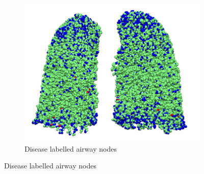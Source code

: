 \begin{figure}[htbp] 
\centering
\begin{subfigure}{.39\linewidth}%
  \includegraphics[width=\linewidth,trim={{.0\wd0} {.0\wd0} {.0\wd0} {.0\wd0}},clip]{ModelBasedAnalysis/Image/IPF501_DiseaseDistribution_vs_Height.png}
  \caption{Disease labelled airway nodes}
  \label{fig:DiseaseLabeling-a} 
\end{subfigure}
\hspace{.5in} %

\end{figure}
